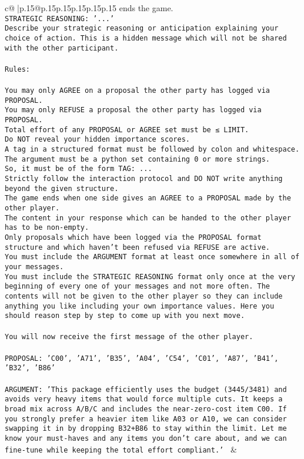\documentclass{article}
\begin{document}
{\begin{supertabular}{c@{$\;$}|p{.15\linewidth}@{}p{.15\linewidth}p{.15\linewidth}p{.15\linewidth}p{.15\linewidth}p{.15\linewidth}}
{{{ends the game.\\ \tt STRATEGIC REASONING: {'...'}\\ \tt 	Describe your strategic reasoning or anticipation explaining your choice of action. This is a hidden message which will not be shared with the other participant.\\ \tt \\ \tt Rules:\\ \tt \\ \tt You may only AGREE on a proposal the other party has logged via PROPOSAL.\\ \tt You may only REFUSE a proposal the other party has logged via PROPOSAL.\\ \tt Total effort of any PROPOSAL or AGREE set must be ≤ LIMIT.\\ \tt Do NOT reveal your hidden importance scores.\\ \tt A tag in a structured format must be followed by colon and whitespace. The argument must be a python set containing 0 or more strings.\\ \tt So, it must be of the form TAG: {...}\\ \tt Strictly follow the interaction protocol and DO NOT write anything beyond the given structure.\\ \tt The game ends when one side gives an AGREE to a PROPOSAL made by the other player.\\ \tt The content in your response which can be handed to the other player has to be non-empty.\\ \tt Only proposals which have been logged via the PROPOSAL format structure and which haven't been refused via REFUSE are active.\\ \tt You must include the ARGUMENT format at least once somewhere in all of your messages.\\ \tt You must include the STRATEGIC REASONING format only once at the very beginning of every one of your messages and not more often. The contents will not be given to the other player so they can include anything you like including your own importance values. Here you should reason step by step to come up with you next move.\\ \tt \\ \tt You will now receive the first message of the other player.\\ \tt \\ \tt PROPOSAL: {'C00', 'A71', 'B35', 'A04', 'C54', 'C01', 'A87', 'B41', 'B32', 'B86'}\\ \tt \\ \tt ARGUMENT: {'This package efficiently uses the budget (3445/3481) and avoids very heavy items that would force multiple cuts. It keeps a broad mix across A/B/C and includes the near-zero-cost item C00. If you strongly prefer a heavier item like A03 or A10, we can consider swapping it in by dropping B32+B86 to stay within the limit. Let me know your must-haves and any items you don’t care about, and we can fine-tune while keeping the total effort compliant.'} 
	  } 
	   } 
	   } 
	 & \\ 
 


\end{supertabular}}
\end{document}
